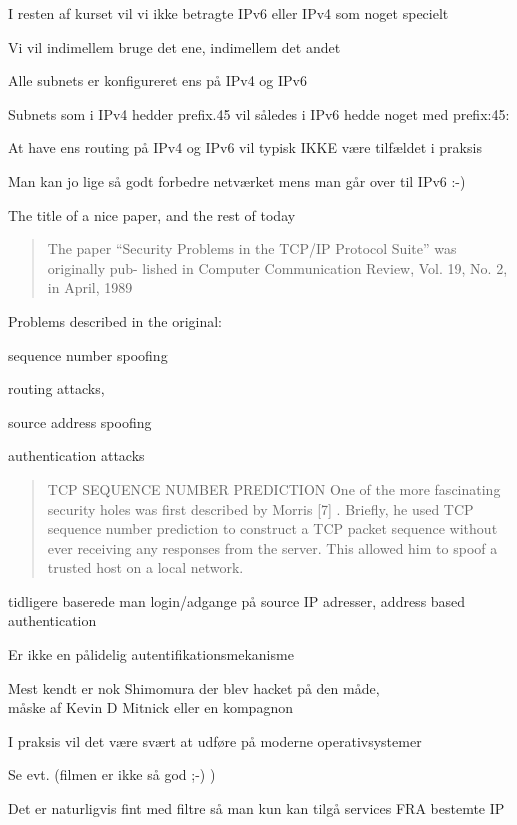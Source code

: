 \documentclass[Screen16to9,17pt]{foils}
\begin{document}
\begin{list1}
\item I resten af kurset vil vi ikke betragte IPv6 eller IPv4 som noget specielt
\item Vi vil indimellem bruge det ene, indimellem det andet
\item Alle subnets er konfigureret ens på IPv4 og IPv6
\item Subnets som i IPv4 hedder prefix.45 vil således i IPv6 hedde noget med prefix:45:
\item At have ens routing på IPv4 og IPv6 vil typisk IKKE være tilfældet i praksis
\item Man kan jo lige så godt forbedre netværket mens man går over til IPv6 :-)
\end{list1}


The title of a nice paper, and the rest of today
\begin{quote}
The paper “Security Problems in the TCP/IP Protocol Suite” was originally pub-
lished in Computer Communication Review, Vol. 19, No. 2, in April, 1989
\end{quote}

\begin{list1}
\item Problems described in the original:
\begin{list2}
\item sequence number spoofing
\item routing attacks,
\item source address spoofing
\item authentication attacks
\end{list2}
\end{list1}


\vskip 5mm
\begin{quote}
TCP SEQUENCE NUMBER PREDICTION
One of the more fascinating security holes was first described by Morris [7] . Briefly, he used TCP
sequence number prediction to construct a TCP packet sequence without ever receiving any responses
from the server. This allowed him to spoof a trusted host on a local network.
\end{quote}

\begin{list1}
\item tidligere baserede man login/adgange på source IP adresser, address based authentication
\item Er ikke en pålidelig autentifikationsmekanisme
\item Mest kendt er nok Shimomura der blev hacket på den måde, \\
måske af Kevin D Mitnick eller en kompagnon
\item I praksis vil det være svært at udføre på moderne operativsystemer
\item Se evt.  (filmen er ikke så god ;-) )
\item Det er naturligvis fint med filtre så man kun kan tilgå services FRA bestemte IP
\end{list1}
\end{document}
